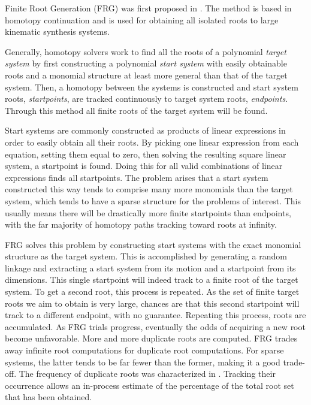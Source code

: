 \documentclass[journal]{IEEEtran}
\begin{document}
Finite Root Generation (FRG) was first proposed in \cite{plecnikFindingOnlyFinite2017}.
The method is based in homotopy continuation and is used for obtaining all isolated roots to large kinematic synthesis systems.

Generally, homotopy solvers work to find all the roots of a polynomial \textit{target system} by first constructing a polynomial \textit{start system} with easily obtainable roots and a monomial structure at least more general than that of the target system.
Then, a homotopy between the systems is constructed and start system roots, \textit{startpoints}, are tracked continuously to target system roots, \textit{endpoints}.
Through this method all finite roots of the target system will be found.

Start systems are commonly constructed as products of linear expressions in order to easily obtain all their roots.
By picking one linear expression from each equation, setting them equal to zero, then solving the resulting square linear system, a startpoint is found.  
Doing this for all valid combinations of linear expressions finds all startpoints.
The problem arises that a start system constructed this way tends to comprise many more monomials than the target system, which tends to have a sparse structure for the problems of interest.
This usually means there will be drastically more finite startpoints than endpoints, with the far majority of homotopy paths tracking toward roots at infinity.


FRG solves this problem by constructing start systems with the exact monomial structure as the target system.
This is accomplished by generating a random linkage and extracting a start system from its motion and a startpoint from its dimensions.
This single startpoint will indeed track to a finite root of the target system.
To get a second root, this process is repeated.
As the set of finite target roots we aim to obtain is very large, chances are that this second startpoint will track to a different endpoint, with no guarantee.
Repeating this process, roots are accumulated.
As FRG trials progress, eventually the odds of acquiring a new root become unfavorable.
More and more duplicate roots are computed.
FRG trades away infinite root computations for duplicate root computations.  
For sparse systems, the latter tends to be far fewer than the former, making it a good trade-off.
The frequency of duplicate roots was characterized in \cite{plecnikStudyFindingFinite2017}.
Tracking their occurrence allows an in-process estimate of the percentage of the total root set that has been obtained.
\end{document}

